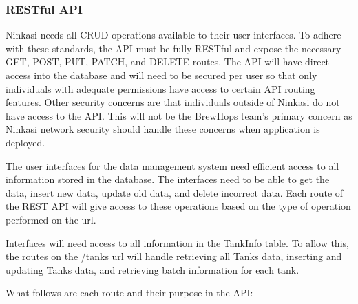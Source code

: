 \documentclass[draftclsnofoot,onecolumn,letterpaper,10pt]{IEEEtran}
\begin{document}
		\subsubsection{RESTful API}

		Ninkasi needs all CRUD operations available to their user interfaces.
		To adhere with these standards, the API must be fully RESTful and expose the necessary GET, POST, PUT, PATCH, and DELETE routes.
		The API will have direct access into the database and will need to be secured per user so that only individuals with adequate permissions have access to certain API routing features.
		Other security concerns are that individuals outside of Ninkasi do not have access to the API.
		This will not be the BrewHops team’s primary concern as Ninkasi network security should handle these concerns when application is deployed.


		The user interfaces for the data management system need efficient access to all information stored in the database.
		The interfaces need to be able to get the data, insert new data, update old data, and delete incorrect data.
		Each route of the REST API will give access to these operations based on the type of operation performed on the url.

		Interfaces will need access to all information in the TankInfo table.
		To allow this, the routes on the /tanks url will handle retrieving all Tanks data, inserting and updating Tanks data, and retrieving batch information for each tank.

		What follows are each route and their purpose in the API:
\end{document}
